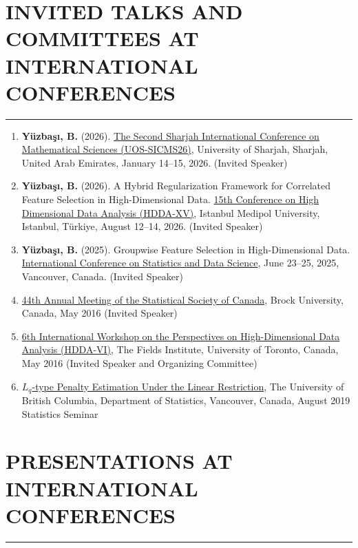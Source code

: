 \documentclass[10pt,letterpaper]{article}
\newcommand{\NewPart}[2]{%
	\Needspace{7\baselineskip}%
	\vspace{0.45em}%
	\section*{\sffamily\large\bfseries\color{MidnightBlue}\uppercase{#1} #2}%
	\vspace{-0.7em}\noindent\color{MidnightBlue}\rule{\textwidth}{0.55pt}\color{Black}\vspace{0.25em}}
\newcommand{\TalkEntry}[4]{
		\noindent #1, #2, #3 #4}
\newenvironment{etaremune}{\begin{enumerate}}{\end{enumerate}}
\begin{document}
\NewPart{Invited Talks and Committees at International Conferences}{}
\begin{etaremune}
\renewcommand{\theenumi}{C1-\arabic{enumi}}


\item {\bf Y\"{u}zba\c{s}{\i}, B.} (2026). \href{https://www.sharjah.ac.ae/Conferences/SICMS26}{The Second Sharjah International Conference on Mathematical Sciences (UOS-SICMS26)}, University of Sharjah, Sharjah, United Arab Emirates, January 14--15, 2026. (Invited Speaker)

\item {\bf Y\"{u}zba\c{s}{\i}, B.} (2026). A Hybrid Regularization Framework for Correlated Feature Selection in High-Dimensional Data. \href{https://hdda2026.medipol.edu.tr}{15th Conference on High Dimensional Data Analysis (HDDA-XV)}, Istanbul Medipol University, Istanbul, T\"{u}rkiye, August 12--14, 2026. (Invited Speaker)

\item {\bf Y\"{u}zba\c{s}{\i}, B.} (2025). Groupwise Feature Selection in High-Dimensional Data. \href{https://icsds.github.io/2025/assets/program_ICSDS2025.pdf}{International Conference on Statistics and Data Science}, June 23--25, 2025, Vancouver, Canada. (Invited Speaker)

\item\TalkEntry{\href{https://ssc.ca/en/2016-some-applications-james-stein-shrinkage-estimation\#by}{44th Annual Meeting of the Statistical Society of Canada}}{Brock University, Canada}{May 2016}{(Invited Speaker)} 

\item\TalkEntry{\href{http://www.fields.utoronto.ca/talks/stein-type-generalized-ridge-regression-high-dimensional-sparse-models}{6th International Workshop on the Perspectives on High-Dimensional
Data Analysis (HDDA-VI)}}{The Fields Institute, University of Toronto, Canada}{May 2016}{(Invited Speaker and Organizing Committee)} 


\item\TalkEntry{\href{https://www.stat.ubc.ca/events-list?field_event_type_tid=All&page=5&year=2005}{$L_q$-type Penalty Estimation Under the Linear Restriction}}{The University of British Columbia, Department of Statistics, Vancouver, Canada}{August 2019}{Statistics Seminar} 



\end{etaremune}


\NewPart{Presentations at International Conferences}{}
\end{document}
